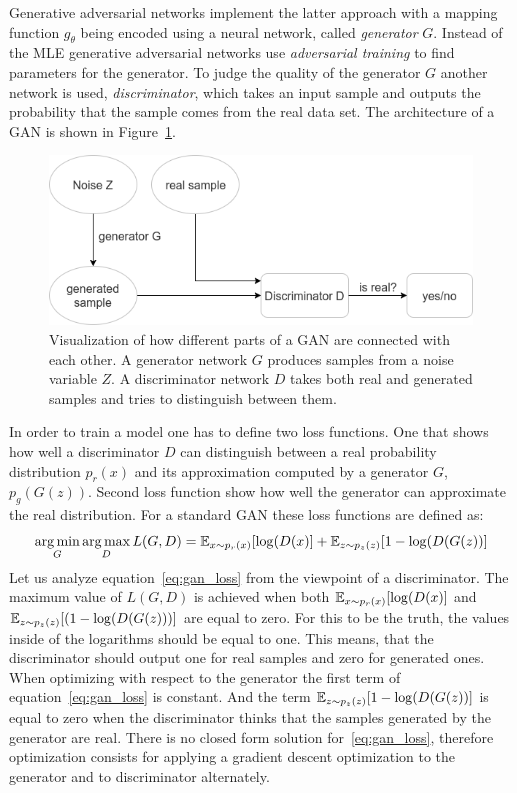 \indent Generative adversarial networks implement the latter approach with a mapping function $g_\theta$ being encoded using a neural network, called \textit{generator} $G$. Instead of the MLE generative adversarial networks use \textit{adversarial training} to find parameters for the generator. To judge the quality of the generator $G$ another network is used, \textit{discriminator}, which takes an input sample and outputs the probability that the sample comes from the real data set. The architecture of a GAN is shown in Figure~\ref{fig:gan}.\\

\begin{figure}[h]
	\includegraphics[width=\textwidth]{figures/gan}
	\caption{Visualization of how different parts of a GAN are connected with each other. A generator network $G$ produces samples from a noise variable $Z$. A discriminator network $D$ takes both real and generated samples and tries to distinguish between them.}
	\label{fig:gan}
\end{figure}

\indent In order to train a model one has to define two loss functions. One that shows how well a discriminator $D$ can distinguish between a real probability distribution $p_r(x)$ and its approximation computed by a generator $G$, $p_g(G(z))$. Second loss function show how well the generator can approximate the real distribution. For a standard GAN these loss functions are defined as: 
\begin{equation} \label{eq:gan_loss}
\operatorname*{arg\,min}_G \operatorname*{arg\,max}_D L(G,D) = \operatorname{\mathbb{E}}_{x \sim p_r(x)} [\log(D(x)] + \operatorname{\mathbb{E}}_{z \sim p_z(z)}[1-\log(D(G(z))]
\end{equation}
Let us analyze equation~\eqref{eq:gan_loss} from the viewpoint of a discriminator. The maximum value of $L(G,D)$ is achieved when both $\operatorname{\mathbb{E}}_{x \sim p_r(x)} [\log(D(x)]$ and $\operatorname{\mathbb{E}}_{z \sim p_z(z)}[(1-\log(D(G(z)))]$ are equal to zero. For this to be the truth, the values inside of the  logarithms should be equal to one. This means, that the discriminator should output one for real samples and zero for generated ones. When optimizing with respect to the generator the first term of equation~\eqref{eq:gan_loss} is constant. And the term $\operatorname{\mathbb{E}}_{z \sim p_z(z)}[1-\log(D(G(z))]$ is equal to zero when the discriminator thinks that the samples generated by the generator are real. There is no closed form solution for~\eqref{eq:gan_loss}, therefore optimization consists for applying a gradient descent optimization to the generator and to discriminator alternately.\\  

